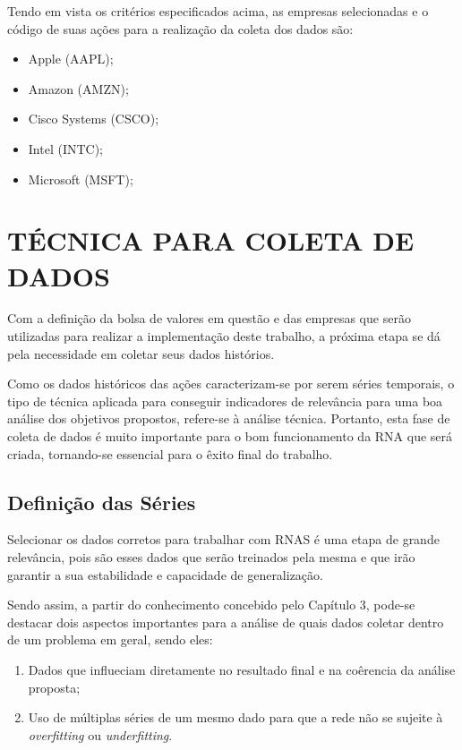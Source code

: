 Tendo em vista os critérios especificados acima, as empresas selecionadas e o código de suas ações para a realização da coleta dos dados são:
\begin{itemize}
	\item Apple (AAPL);
	\item Amazon (AMZN);
	\item Cisco Systems (CSCO);
	\item Intel (INTC);
	\item Microsoft (MSFT);
\end{itemize}

\section{TÉCNICA PARA COLETA DE DADOS}
Com a definição da bolsa de valores em questão e das empresas que serão utilizadas para realizar a implementação deste trabalho, a próxima etapa se dá pela necessidade em coletar seus dados histórios.

Como os dados históricos das ações caracterizam-se por serem séries temporais, o tipo de técnica aplicada para conseguir indicadores de relevância para uma boa análise dos objetivos propostos, refere-se à análise técnica. Portanto, esta fase de coleta de dados é muito importante para o bom funcionamento da RNA que será criada, tornando-se essencial para o êxito final do trabalho.

\subsection{Definição das Séries}
Selecionar os dados corretos para trabalhar com RNAS é uma etapa de grande relevância, pois são esses dados que serão treinados pela mesma e que irão garantir a sua estabilidade e capacidade de generalização.

Sendo assim, a partir do conhecimento concebido pelo Capítulo 3, pode-se destacar dois aspectos importantes para a análise de quais dados coletar dentro de um problema em geral, sendo eles:

\begin{enumerate}
\item Dados que influeciam diretamente no resultado final e na coêrencia da análise proposta;
\item Uso de múltiplas séries de um mesmo dado para que a rede não se sujeite à \textit{overfitting} ou \textit{underfitting}.
\end{enumerate}

